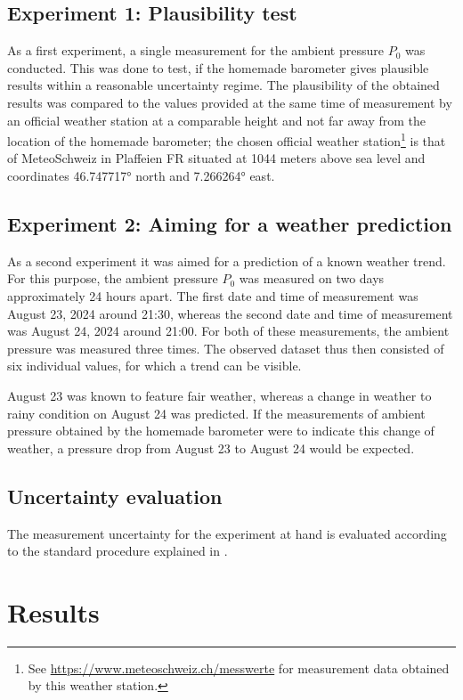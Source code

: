 \documentclass[a4paper,11pt, twocolumn]{article}
\begin{document}
\subsection{Experiment 1: Plausibility test}
As a first experiment, a single measurement for the ambient pressure $P_0$ was conducted. This was done to test, if the homemade barometer gives plausible results within a reasonable uncertainty regime. The plausibility of the obtained results was compared to the values provided at the same time of measurement by an official weather station at a comparable height and not far away from the location of the homemade barometer; the chosen official weather station\footnote{See \href{https://www.meteoschweiz.admin.ch/service-und-publikationen/applikationen/messwerte-und-messnetze.html}{https://www.meteoschweiz.ch/messwerte} for measurement data obtained by this weather station.} is that of MeteoSchweiz in Plaffeien FR situated at 1044 meters above sea level and coordinates \ang{46.747717} north and \ang{7.266264} east.

\subsection{Experiment 2: Aiming for a weather prediction}
As a second experiment it was aimed for a prediction of a known weather trend. For this purpose, the ambient pressure $P_0$ was measured on two days approximately 24 hours apart. The first date and time of measurement was August 23, 2024 around 21:30, whereas the second date and time of measurement was August 24, 2024 around 21:00. For both of these measurements, the ambient pressure was measured three times. The observed dataset thus then consisted of six individual values, for which a trend can be visible.

August 23 was known to feature fair weather, whereas a change in weather to rainy condition on August 24 was predicted. If the measurements of ambient pressure obtained by the homemade barometer were to indicate this change of weather, a pressure drop from August 23 to August 24 would be expected.

\subsection{Uncertainty evaluation}
The measurement uncertainty for the experiment at hand is evaluated according to the standard procedure explained in \cite{GUM2023}.

\section{Results}
\end{document}
